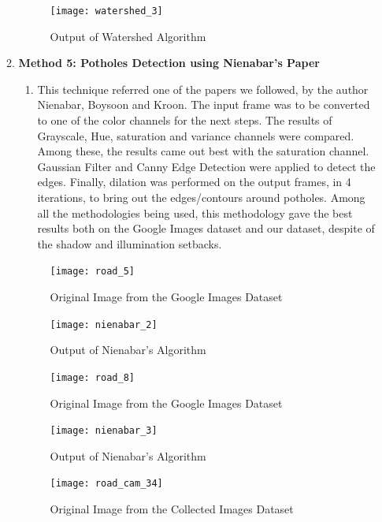 \documentclass[12pt,a4paper]{article}
\begin{document}
\begin{enumerate}
\begin{enumerate}
    \begin{figure}[ht!]
        \centering
        \texttt{[image: watershed\_3]}
        \caption{Output of Watershed Algorithm}
    \end{figure}
    \pagebreak
    
    \item \textbf{Method 5: Potholes Detection using Nienabar's Paper}
    \begin{enumerate}
        \item This technique referred one of the papers we followed, by the author Nienabar, Boysoon and Kroon. The input frame was to be converted to one of the color channels for the next steps. The results of Grayscale, Hue, saturation and variance channels were compared. Among these, the results came out best with the saturation channel. Gaussian Filter and Canny Edge Detection were applied to detect the edges. Finally, dilation was performed on the output frames, in 4 iterations, to bring out the edges/contours around potholes.
        Among all the methodologies being used, this methodology gave the best results both on the Google Images dataset and our dataset, despite of the shadow and illumination setbacks.
    \end{enumerate}
    \begin{figure}[ht!]
        \centering
        \texttt{[image: road\_5]}
        \caption{Original Image from the Google Images Dataset}
    \end{figure}

    \begin{figure}[ht!]
        \centering
        \texttt{[image: nienabar\_2]}
        \caption{Output of Nienabar's Algorithm}
    \end{figure}
    \pagebreak
    
    \begin{figure}[ht!]
        \centering
        \texttt{[image: road\_8]}
        \caption{Original Image from the Google Images Dataset}
    \end{figure}

    \begin{figure}[ht!]
        \centering
        \texttt{[image: nienabar\_3]}
        \caption{Output of Nienabar's Algorithm}
    \end{figure}
    \pagebreak
    
    \begin{figure}[ht!]
        \centering
        \texttt{[image: road\_cam\_34]}
        \caption{Original Image from the Collected Images Dataset}
    \end{figure}


\end{enumerate}
\end{enumerate}
\end{document}
